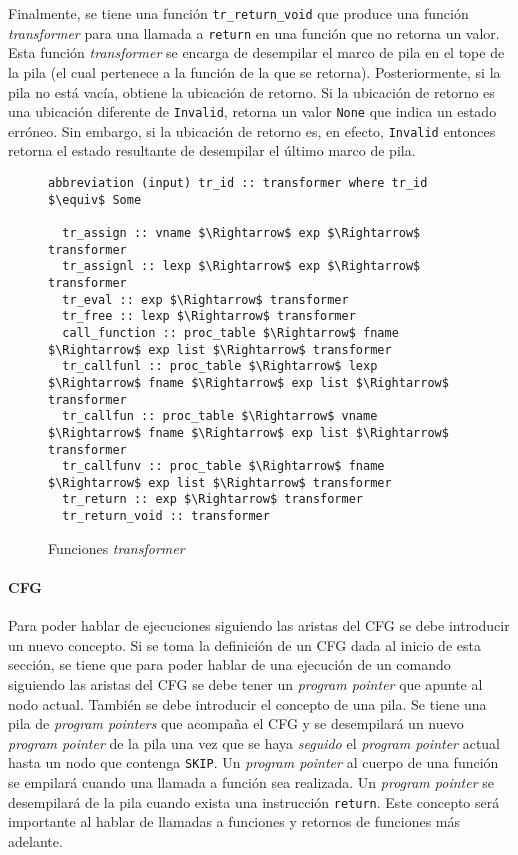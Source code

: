 Finalmente, se tiene una función \verb|tr_return_void| que produce una función \textit{transformer} para una llamada a \verb|return| en una función que no retorna un valor.
Esta función \textit{transformer} se encarga de desempilar el marco de pila en el tope de la pila (el cual pertenece a la función de la que se retorna).
Posteriormente, si la pila no está vacía, obtiene la ubicación de retorno.
Si la ubicación de retorno es una ubicación diferente de \verb|Invalid|, retorna un valor \verb|None| que indica un estado erróneo.
Sin embargo, si la ubicación de retorno es, en efecto, \verb|Invalid| entonces retorna el estado resultante de desempilar el último marco de pila.

\begin{comment}
FIXME
\end{comment}

\begin{figure}
  \begin{lstlisting}[frame=single, mathescape=true]
  abbreviation (input) tr_id :: transformer where tr_id $\equiv$ Some

  tr_assign :: vname $\Rightarrow$ exp $\Rightarrow$ transformer
  tr_assignl :: lexp $\Rightarrow$ exp $\Rightarrow$ transformer
  tr_eval :: exp $\Rightarrow$ transformer
  tr_free :: lexp $\Rightarrow$ transformer
  call_function :: proc_table $\Rightarrow$ fname $\Rightarrow$ exp list $\Rightarrow$ transformer
  tr_callfunl :: proc_table $\Rightarrow$ lexp $\Rightarrow$ fname $\Rightarrow$ exp list $\Rightarrow$ transformer
  tr_callfun :: proc_table $\Rightarrow$ vname $\Rightarrow$ fname $\Rightarrow$ exp list $\Rightarrow$ transformer
  tr_callfunv :: proc_table $\Rightarrow$ fname $\Rightarrow$ exp list $\Rightarrow$ transformer
  tr_return :: exp $\Rightarrow$ transformer
  tr_return_void :: transformer
  \end{lstlisting}

  \caption{Funciones \textit{transformer}}
  \label{fig:transformer_def}
\end{figure}


\paragraph*{CFG}

Para poder hablar de ejecuciones siguiendo las aristas del CFG se debe introducir un nuevo concepto.
Si se toma la definición de un CFG dada al inicio de esta sección, se tiene que para poder hablar de una ejecución de un comando siguiendo las aristas del CFG se debe tener un \textit{program pointer} que apunte al nodo actual.
También se debe introducir el concepto de una pila.
Se tiene una pila de \textit{program pointers} que acompaña el CFG y se desempilará un nuevo \textit{program pointer} de la pila una vez que se haya \textit{seguido} el \textit{program pointer} actual hasta un nodo que contenga \verb|SKIP|.
Un \textit{program pointer} al cuerpo de una función se empilará cuando una llamada a función sea realizada.
Un \textit{program pointer} se desempilará de la pila cuando exista una instrucción \verb|return|.
Este concepto será importante al hablar de llamadas a funciones y retornos de funciones más adelante.

